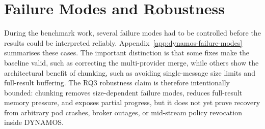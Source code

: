 \section{Failure Modes and Robustness}

During the benchmark work, several failure modes had to be controlled before the results could be interpreted reliably. Appendix~\ref{app:dynamos-failure-modes} summarises these cases. The important distinction is that some fixes make the baseline valid, such as correcting the multi-provider merge, while others show the architectural benefit of chunking, such as avoiding single-message size limits and full-result buffering. The RQ3 robustness claim is therefore intentionally bounded: chunking removes size-dependent failure modes, reduces full-result memory pressure, and exposes partial progress, but it does not yet prove recovery from arbitrary pod crashes, broker outages, or mid-stream policy revocation inside DYNAMOS.
